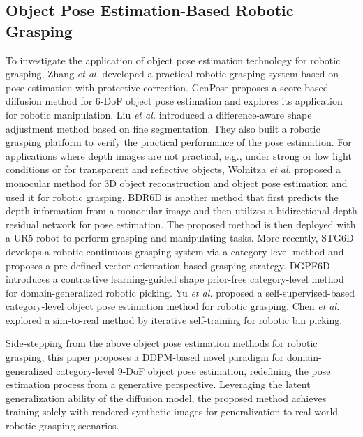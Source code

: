 \vspace{-1em}
\subsection{Object Pose Estimation-Based Robotic Grasping}
To investigate the application of object pose estimation technology for robotic grasping, Zhang \emph{et al.}\cite{41} developed a practical robotic grasping system based on pose estimation with protective correction. GenPose \cite{42} proposes a score-based diffusion method for 6-DoF object pose estimation and explores its application for robotic manipulation. Liu \emph{et al.}\cite{43} introduced a difference-aware shape adjustment method based on fine segmentation. They also built a robotic grasping platform to verify the practical performance of the pose estimation. For applications where depth images are not practical, e.g., under strong or low light conditions or for transparent and reflective objects, Wolnitza \emph{et al.}\cite{44} proposed a monocular method for 3D object reconstruction and object pose estimation and used it for robotic grasping. BDR6D\cite{45} is another method that first predicts the depth information from a monocular image and then utilizes a bidirectional depth residual network for pose estimation. The proposed method is then deployed with a UR5 robot to perform grasping and manipulating tasks. More recently, STG6D\cite{23} develops a robotic continuous grasping system via a category-level method and proposes a pre-defined vector orientation-based grasping strategy. DGPF6D\cite{46} introduces a contrastive learning-guided shape prior-free category-level method for domain-generalized robotic picking. Yu \emph{et al.}\cite{47} proposed a self-supervised-based category-level object pose estimation method for robotic grasping. Chen \emph{et al.}\cite{48} explored a sim-to-real method by iterative self-training for robotic bin picking.

\par Side-stepping from the above object pose estimation methods for robotic grasping, this paper proposes a DDPM-based novel paradigm for domain-generalized category-level 9-DoF object pose estimation, redefining the pose estimation process from a generative perspective. Leveraging the latent generalization ability of the diffusion model, the proposed method achieves training solely with rendered synthetic images for generalization to real-world robotic grasping scenarios.

\vspace{-0.5em}